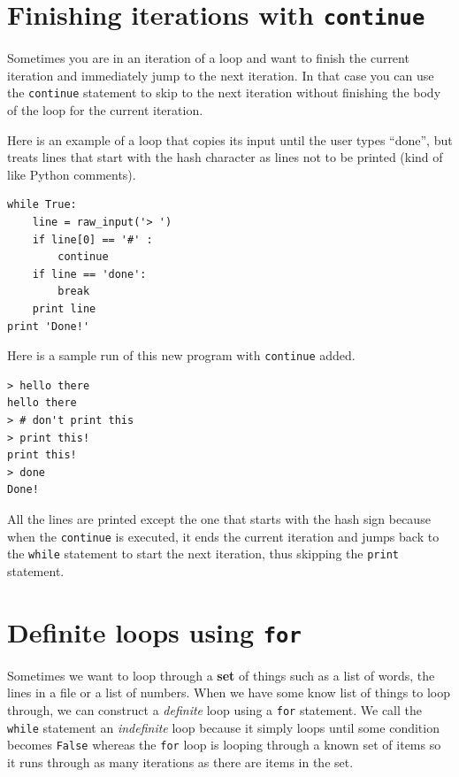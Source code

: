 \documentclass[10pt]{book}
\begin{document}
\section{Finishing iterations with {\tt continue}}

Sometimes you are in an iteration of a loop and want to finish the
current iteration and immediately jump to the next iteration.
In that case you can use the {\tt continue}
statement to skip to the next iteration without finishing the
body of the loop for the current iteration.

Here is an example of a loop that copies its input until the user
types ``done'', but treats lines that start with the hash character
as lines not to be printed (kind of like Python comments).

\beforeverb
\begin{verbatim}
while True:
    line = raw_input('> ')
    if line[0] == '#' :
        continue
    if line == 'done':
        break
    print line
print 'Done!'
\end{verbatim}
\afterverb
%
Here is a sample run of this new program with {\tt continue} added.

\beforeverb
\begin{verbatim}
> hello there
hello there
> # don't print this
> print this!
print this!
> done
Done!
\end{verbatim}
\afterverb
%
All the lines are printed except the one that starts with the hash
sign because when the {\tt continue} is executed, it ends 
the current iteration and jumps
back to the {\tt while} statement to start the next iteration, thus 
skipping the {\tt print} statement.

\section{Definite loops using {\tt for} }

Sometimes we want to loop through a {\bf set} of things such 
as a list of words, the lines in a file or a list of numbers.
When we have some know list of things to loop through, we can
construct a {\em definite} loop using a {\tt for} statement.
We call the {\tt while} statement an {\em indefinite} loop
because it simply loops until some condition becomes {\tt False} 
whereas the {\tt for} loop is looping through a known
set of items so it runs through as many iterations as there
are items in the set.
\end{document}
